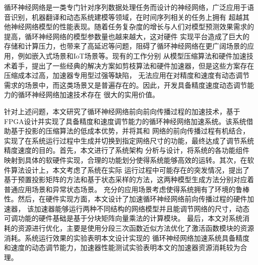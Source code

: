 	
\begin{chineseabstract}
循环神经网络是一类专门针对序列数据处理任务而设计的神经网络，广泛应用于语音识别，机器翻译和动态系统建模等领域，在时间序列相关的任务上拥有
超越其他神经网络模型的性能表现。随着任务复杂度的增长与人们对模型预测效果需求的提高，循环神经网络的模型参数量也越来越大，这对硬件
实现平台造成了巨大的存储和计算压力，也带来了高延迟等问题，阻碍了循环神经网络在更广阔场景的应用，例如嵌入式场景和IoT场景等。现有的工作分别
从模型压缩算法和硬件加速技术着手，提出了一些经典的解决方案如剪枝算法和硬件加速器，但是这些方案存在压缩成本过高，加速器专用型过强等缺陷，
无法应用在对精度和速度有动态调节需求的场景中，而这类场景又是普遍存在的。因此，开发具备精度速度动态调节能力的循环神经网络加速技术存在
很大的实用价值。

针对上述问题，本文研究了循环神经网络前向前向传播过程的加速技术，基于FPGA设计并实现了具备精度和速度调节能力的循环神经网络加速系统。该系统借助基于投影的压缩算法的低成本优势，并将其和
网络的前向传播过程有机结合，实现了在系统运行过程中生成并切换到指定网络尺寸的功能，最终达成了调节系统精度速度的目的。首先，本文进行了系统架构
分析与设计，将系统的各功能组件映射到具体的软硬件实现，合理的功能划分使得系统能够高效的运转。其次，在软件算法设计上，本文考虑了系统在实际
运行过程中可能存在的突发情况，提出了基于预置投影矩阵的方法和基于状态采样的方法，这两种模型生成方法分别对应着普通应用场景和异常状态场景。
充分的应用场景考虑使得系统拥有了环境的鲁棒性。然后，在硬件实现方面，本文设计了加速循环神经网络前向传播过程的硬件加速器，
该加速器能够运行两种不同结构的网络模型并且能调节网络的尺寸，动态可调功能的硬件基础是基于分块矩阵向量乘法的计算模块。
最后，本文对系统消耗的资源进行优化，主要是使用分段三次函数近似方法优化了激活函数模块的资源消耗。系统运行效果的实验表明本文设计实现的
循环神经网络加速系统具备精度和速度的动态调节能力，加速器性能测试实验表明本文的加速器资源消耗较为合理。



\end{chineseabstract}
